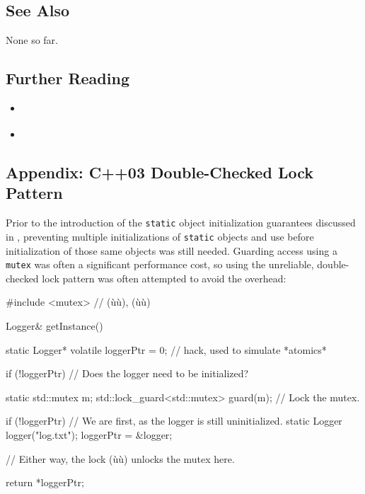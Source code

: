 \subsection[See Also]{See Also}\label{see-also}

None so far.

\subsection[Further Reading]{Further Reading}\label{further-reading}

\begin{itemize}
\item{\cite{meyers04}}
\item{\cite{stroustrup20}}
\end{itemize}

\subsection[Appendix: C++03 Double-Checked Lock Pattern]{Appendix: C++03 Double-Checked Lock Pattern}\label{appendix:-c++03-double-checked-lock-pattern}

Prior to the introduction of the  \lstinline!static!
object initialization guarantees discussed in , preventing multiple initializations of \lstinline!static! objects
and use before initialization of those same objects was still needed.
Guarding access using a \lstinline!mutex! was often a significant performance cost, so
using the unreliable, double-checked lock pattern was often attempted to
avoid the overhead:

\begin{emcppshiddenlisting}[emcppsbatch=e16]
#include <mutex>  // (ù{}ù), (ù{}ù)
\end{emcppshiddenlisting}
\begin{emcppslisting}[emcppsbatch=e16]
Logger& getInstance()
{
    static Logger* volatile loggerPtr = 0;  // hack, used to simulate *atomics*

    if (!loggerPtr)  // Does the logger need to be initialized?
    {
        static std::mutex m;
        std::lock_guard<std::mutex> guard(m);  // Lock the mutex.

        if (!loggerPtr)  // We are first, as the logger is still uninitialized.
        {
            static Logger logger("log.txt");
            loggerPtr = &logger;
        }
    }                    // Either way, the lock (ù{}ù) unlocks the mutex here.

    return *loggerPtr;
}
\end{emcppslisting}

